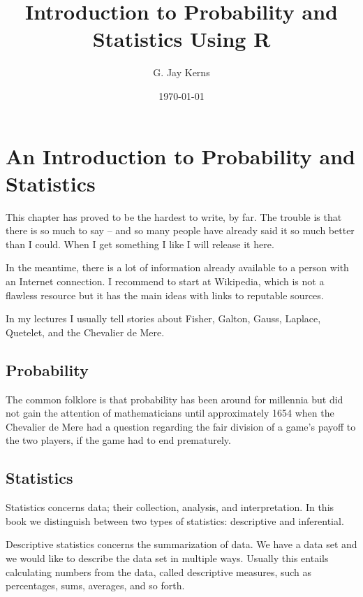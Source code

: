 \documentclass[captions=tableheading]{scrbook}
\title{Introduction to Probability and Statistics Using R}
\author{G. Jay Kerns}
\date{\today}
\begin{document}
\maketitle






\chapter{An Introduction to Probability and Statistics}
\label{sec-1}


\noindent 
This chapter has proved to be the hardest to write, by far. The trouble is that there is so much to say -- and so many people have already said it so much better than I could. When I get something I like I will release it here.

In the meantime, there is a lot of information already available to a person with an Internet connection. I recommend to start at Wikipedia, which is not a flawless resource but it has the main ideas with links to reputable sources.

In my lectures I usually tell stories about Fisher, Galton, Gauss, Laplace, Quetelet, and the Chevalier de Mere.
\section{Probability}
\label{sec-1-1}


The common folklore is that probability has been around for millennia but did not gain the attention of mathematicians until approximately 1654 when the Chevalier de Mere had a question regarding the fair division of a game's payoff to the two players, if the game had to end prematurely.
\section{Statistics}
\label{sec-1-2}


Statistics concerns data; their collection, analysis, and interpretation. In this book we distinguish between two types of statistics: descriptive and inferential. 

Descriptive statistics concerns the summarization of data. We have a data set and we would like to describe the data set in multiple ways. Usually this entails calculating numbers from the data, called descriptive measures, such as percentages, sums, averages, and so forth.
\end{document}
